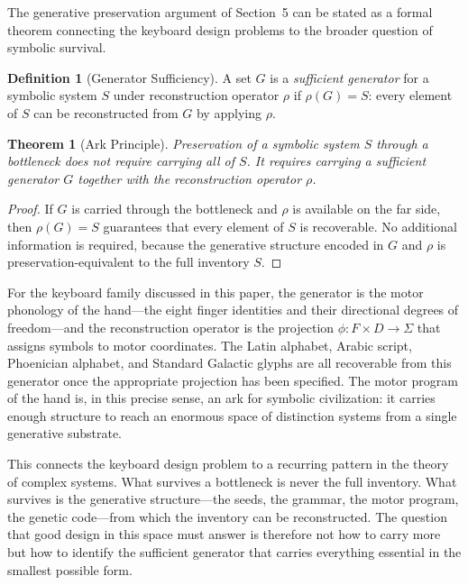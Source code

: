 \documentclass[12pt,a4paper]{article}
\theoremstyle{plain}
\newtheorem{theorem}{Theorem}
\theoremstyle{definition}
\newtheorem{definition}{Definition}
\theoremstyle{remark}
\begin{document}
The generative preservation argument of Section~5 can be stated as a formal
theorem connecting the keyboard design problems to the broader question of
symbolic survival.

\begin{definition}[Generator Sufficiency]
A set $G$ is a \emph{sufficient generator} for a symbolic system $S$ under
reconstruction operator $\rho$ if $\rho(G) = S$: every element of $S$ can
be reconstructed from $G$ by applying $\rho$.
\end{definition}

\begin{theorem}[Ark Principle]
Preservation of a symbolic system $S$ through a bottleneck does not require
carrying all of $S$. It requires carrying a sufficient generator $G$ together
with the reconstruction operator $\rho$.
\end{theorem}

\begin{proof}
If $G$ is carried through the bottleneck and $\rho$ is available on the far
side, then $\rho(G) = S$ guarantees that every element of $S$ is recoverable.
No additional information is required, because the generative structure
encoded in $G$ and $\rho$ is preservation-equivalent to the full inventory $S$.
\end{proof}

For the keyboard family discussed in this paper, the generator is the motor
phonology of the hand---the eight finger identities and their directional
degrees of freedom---and the reconstruction operator is the projection
$\phi : F \times D \to \Sigma$ that assigns symbols to motor coordinates.
The Latin alphabet, Arabic script, Phoenician alphabet, and Standard Galactic
glyphs are all recoverable from this generator once the appropriate projection
has been specified. The motor program of the hand is, in this precise sense,
an ark for symbolic civilization: it carries enough structure to reach an
enormous space of distinction systems from a single generative substrate.

This connects the keyboard design problem to a recurring pattern in the
theory of complex systems. What survives a bottleneck is never the full
inventory. What survives is the generative structure---the seeds, the grammar,
the motor program, the genetic code---from which the inventory can be
reconstructed. The question that good design in this space must answer is
therefore not how to carry more but how to identify the sufficient generator
that carries everything essential in the smallest possible form.
\end{document}
